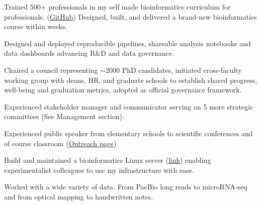 \documentclass[a4paper,10pt]{article}
\begin{document}
{\begin{adjustbox}{valign=t}
\begin{minipage}[t]{0.6\textwidth}
\begin{description}
  \item Trained 500+ professionals in my self made bioinformatics curriculum for professionals. 
    (\href{https://github.com/lauralwd/professional_education}{GitHub})
  Designed, built, and delivered a brand-new bioinformatics course within weeks.%
  \item Designed and deployed reproducible pipelines, shareable analysis notebooks and data dashboards advancing R\&D  and data governance. 
  \item Chaired a council representing $\sim$2000 PhD candidates,
    initiated cross-faculty working group with deans, HR, and graduate schools to establish shared progress, well-being and graduation metrics, 
    adopted as official governance framework.
  \item Experienced stakeholder manager and communicator serving on 5 more strategic committees
    (See Management section).
  \item Experienced public speaker from elementary schools to scientific conferences 
    and of course classroom 
    (\href{https://lauralwd.github.io/outreach/}{Outreach page}).
  \item Build and maintained a bioinformatics Linux server 
    (\href{https://lauralwd.github.io/blog/post-mpp-server/}{link}) 
    enabling experimentalist colleagues to use my infrastructure with ease.
  \item Worked with a wide variety of data. 
    From PacBio long reads to microRNA-seq and from optical mapping to handwritten notes.
\end{description}

\end{minipage}%
\end{adjustbox}%
}
\newpage
\end{document}
